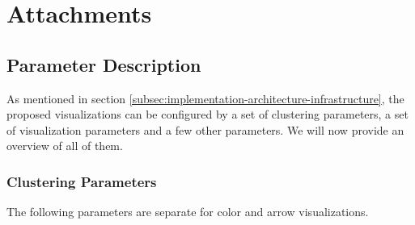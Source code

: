\chapter{Attachments}

\section{Parameter Description}
\label{attch:parameter_description}

As mentioned in section \ref{subsec:implementation-architecture-infrastructure}, the proposed visualizations can be configured by a set of clustering parameters, a set of visualization parameters and a few other parameters. We will now provide an overview of all of them.

\subsection{Clustering Parameters}
\label{attch:parameter_desc-clustering_parameters}

The following parameters are separate for color and arrow visualizations.

